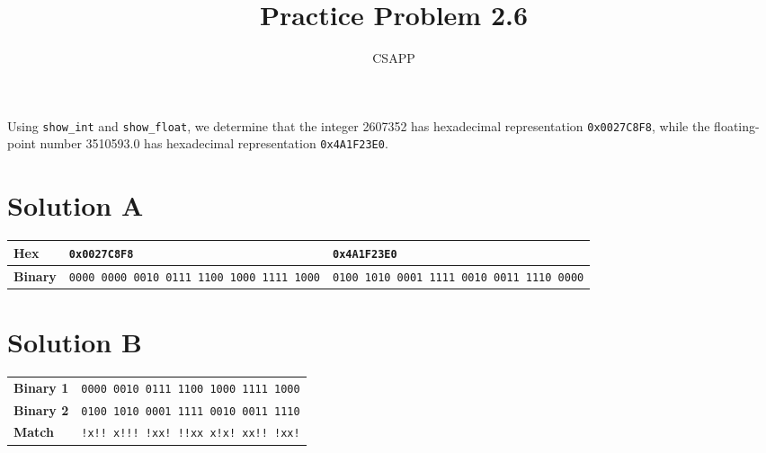 \documentclass{article}
\title{Practice Problem 2.6}
\author{CSAPP}
\date{}
\begin{document}
\maketitle

\begin{flushleft}
    Using \texttt{show\_int} and \texttt{show\_float}, we determine that the
    integer 2607352 has hexadecimal representation \texttt{0x0027C8F8}, while
    the floating-point number 3510593.0 has hexadecimal representation
    \texttt{0x4A1F23E0}.
\end{flushleft}

\bigskip

\hspace{1em}\section*{\small Solution A}
\begin{center}
    \footnotesize
    \begin{tabular}{l l l}
        \toprule
        \textbf{Hex}    & \texttt{0x0027C8F8} & \texttt{0x4A1F23E0} \\
        \midrule
        \textbf{Binary} & \texttt{0000~0000~0010~0111~1100~1000~1111~1000} & \texttt{0100~1010~0001~1111~0010~0011~1110~0000} \\
        \bottomrule
    \end{tabular}
\end{center}

\bigskip

\section*{\small Solution B}
\begin{center}
    \footnotesize
    \begin{tabular}{l l}
        \toprule
        \textbf{Binary 1} & \texttt{0000~0010~0111~1100~1000~1111~1000} \\
        \textbf{Binary 2} & \texttt{0100~1010~0001~1111~0010~0011~1110} \\
        \textbf{Match}    & \texttt{!x!!~x!!!~!xx!~!!xx~x!x!~xx!!~!xx!} \\
        \bottomrule
    \end{tabular}
\end{center}

\bigskip
\end{document}
